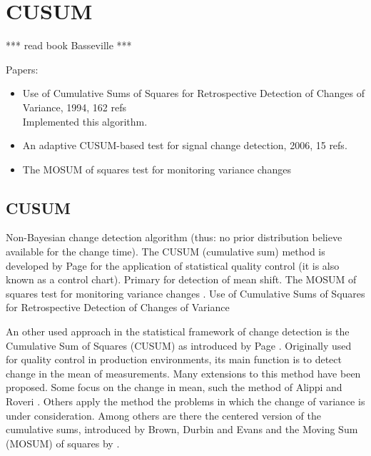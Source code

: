 \section{CUSUM}\label{cusum}

*** read book Basseville \cite{basseville1993detection} ***


Papers:
\begin{itemize}
  \item Use of Cumulative Sums of Squares for Retrospective Detection of Changes of Variance, 1994, 162 refs \cite{inclan1994use} \\
  Implemented this algorithm.
  \item An adaptive CUSUM-based test for signal change detection, 2006, 15 refs. \cite{alippi2006adaptive}
  \item The MOSUM of squares test for monitoring variance changes \cite{hsu2007mosum}
\end{itemize}


\subsection{CUSUM}
Non-Bayesian change detection algorithm (thus: no prior distribution believe available for the change time).
The CUSUM (cumulative sum) method is developed by Page \cite{page1954continuous} for the application of statistical quality control (it is also known as a control chart).
Primary for detection of mean shift.
The MOSUM of squares test for monitoring variance changes \cite{hsu2007mosum}.
Use of Cumulative Sums of Squares for Retrospective Detection of Changes of Variance \cite{inclan1994use}


An other used approach in the statistical framework of change detection is the Cumulative Sum of Squares (CUSUM) as introduced by Page \cite{page1954continuous}.
Originally used for quality control in production environments, its main function is to detect change in the mean of measurements.
Many extensions to this method have been proposed.
Some focus on the change in mean, such the method of Alippi and Roveri \cite{alippi2006adaptive}.
Others apply the method the problems in which the change of variance is under consideration.
Among others are there the centered version of the cumulative sums, introduced by Brown, Durbin and Evans \cite{brown1975techniques} and the Moving Sum (MOSUM) of squares by \cite{hsu2007mosum}.

